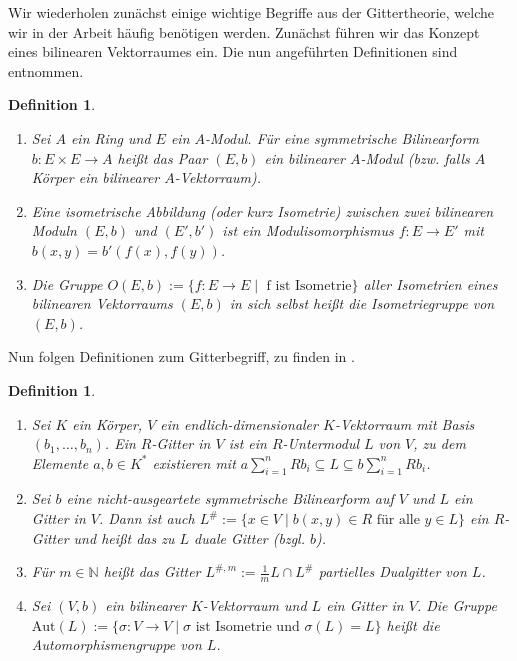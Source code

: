 \documentclass[12pt,a4paper,halfparskip,headsepline,bibtotocnumbered]{scrreprt}
\theoremstyle{nummermitklammern}
\newtheorem{definition}[defsatzusw]{Definition}
\theoremstyle{nonumberbreak}
\newcommand{\N}{\mathbb{N}}
\newcommand{\Aut}{\text{Aut}}
\begin{document}
Wir wiederholen zunächst einige wichtige Begriffe aus der Gittertheorie, welche wir in der Arbeit häufig benötigen werden. Zunächst führen wir das Konzept eines bilinearen Vektorraumes ein. Die nun angeführten Definitionen sind \cite[Def. (2.1)]{kneser} entnommen.

\begin{framed}
	\begin{definition}
		\begin{enumerate}[label=(\roman*)]
			\item Sei $A$ ein Ring und $E$ ein $A$-Modul. Für eine symmetrische Bilinearform\linebreak
				$b : E \times E \rightarrow A$ heißt das Paar $(E,b)$ ein \textit{bilinearer $A$-Modul} (bzw. falls $A$ Körper ein \textit{bilinearer $A$-Vektorraum}).
			\item Eine \textit{isometrische Abbildung} (oder kurz \textit{Isometrie}) zwischen zwei bilinearen Moduln $(E,b)$ und $(E', b')$ ist ein Modulisomorphismus $f : E \rightarrow E'$ mit $b(x,y) = b'(f(x), f(y))$.
			\item Die Gruppe $O(E,b) := \lbrace f : E \rightarrow E \mid \text{ f ist Isometrie}\rbrace$ aller Isometrien eines bilinearen Vektorraums $(E,b)$ in sich selbst heißt die \textit{Isometriegruppe} von $(E,b)$.
		\end{enumerate}
	\end{definition}
\end{framed}

Nun folgen Definitionen zum Gitterbegriff, zu finden in \cite[Def. (14.1), (14.2)]{kneser}.
\begin{framed}
	\begin{definition}
		\begin{enumerate}[label=(\roman*)]
			\item Sei $K$ ein Körper, $V$ ein endlich-dimensionaler $K$-Vektorraum mit Basis $(b_1,\dots,b_n)$. Ein $R$-Gitter in $V$ ist ein $R$-Untermodul $L$ von $V$, zu dem Elemente $a,b \in K^*$ existieren mit $a \sum_{i=1}^n R b_i \subseteq L \subseteq b \sum_{i=1}^n R b_i$.
			\item Sei $b$ eine nicht-ausgeartete symmetrische Bilinearform auf $V$ und $L$ ein Gitter in $V$. Dann ist auch $L^\# := \lbrace x \in V \mid b(x,y) \in R \text{ für alle } y \in L \rbrace$ ein $R$-Gitter und heißt \textit{das zu $L$ duale Gitter} (bzgl. $b$).
			\item Für $m \in \N$ heißt das Gitter $L^{\#,m} := \frac{1}{m}L \cap L^\#$ \textit{partielles Dualgitter} von $L$.
			\item Sei $(V,b)$ ein bilinearer $K$-Vektorraum und $L$ ein Gitter in $V$. Die Gruppe $\Aut(L) := \lbrace \sigma : V \rightarrow V \mid \sigma \text{ ist Isometrie und } \sigma(L) = L \rbrace$ heißt die \textit{Automorphismengruppe} von $L$.
		\end{enumerate}
	\end{definition}
\end{framed}
\end{document}
